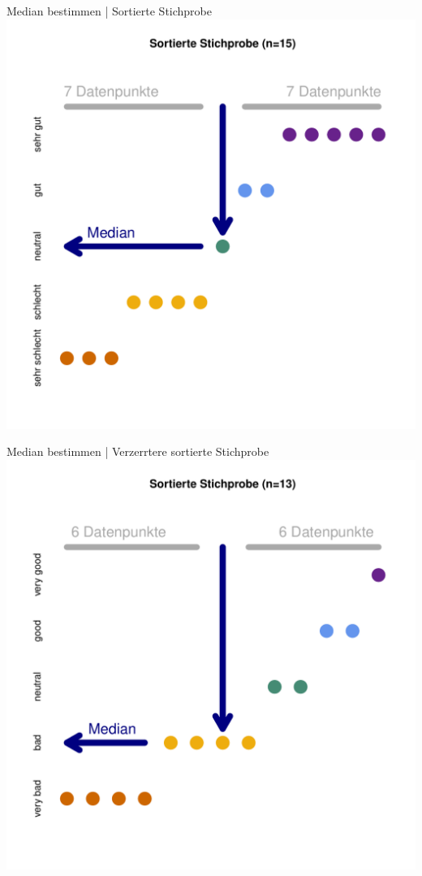 \begin{frame}
  {Median bestimmen | Sortierte Stichprobe}
  \centering 
  \includegraphics[height=0.9\textheight]{RVorlesung/median1b}
\end{frame}

\begin{frame}
  {Median bestimmen | Verzerrtere sortierte Stichprobe}
  \centering 
  \includegraphics[height=0.9\textheight]{RVorlesung/median2}
\end{frame}

